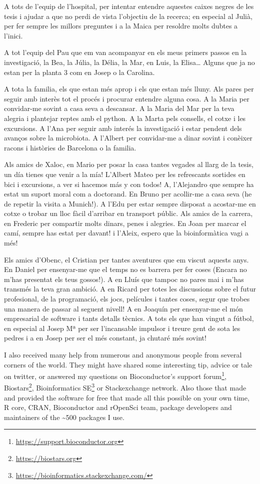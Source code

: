 \documentclass[
  12pt,
  a4paper,
  twoside,
  openright]{book}
\DeclareRobustCommand{\href}[2]{#2\footnote{\url{#1}}}
\begin{document}
A tots de l'equip de l'hospital, per intentar entendre aquestes caixes negres de les tesis i ajudar a que no perdi de vista l'objectiu de la recerca; en especial al Julià, per fer sempre les millors preguntes i a la Maica per resoldre molts dubtes a l'inici.

A tot l'equip del Pau que em van acompanyar en els meus primers passos en la investigació, la Bea, la Júlia, la Délia, la Mar, en Luis, la Elisa\ldots{}
Alguns que ja no estan per la planta 3 com en Josep o la Carolina.

A tota la familia, els que estan més aprop i els que estan més lluny.
Als pares per seguir amb interès tot el procés i procurar entendre alguna cosa.
A la Maria per convidar-me sovint a casa seva a descansar.
A la Maria del Mar per la teva alegria i plantejar reptes amb el python.
A la Marta pels consells, el cotxe i les excursions.
A l'Ana per seguir amb interés la investigació i estar pendent dels avanços sobre la microbiota.
A l'Albert per convidar-me a dinar sovint i conèixer racons i històries de Barcelona o la familia.

Als amics de Xaloc, en Mario per posar la casa tantes vegades al llarg de la tesis, un día tienes que venir a la mía!
L'Albert Mateo per les refrescants sortides en bici i excursions, a ver si hacemos más y con todos!
A, l'Alejandro que sempre ha estat un suport moral com a doctorand.
En Bruno per acollir-me a casa seva (he de repetir la visita a Munich!).
A l'Edu per estar sempre disposat a acostar-me en cotxe o trobar un lloc fàcil d'arribar en transport públic.
Als amics de la carrera, en Frederic per compartir molts dinars, penes i alegries.
En Joan per marcar el camí, sempre has estat per davant! i l'Aleix, espero que la bioinformàtica vagi a més!

Els amics d'Obenc, el Cristian per tantes aventures que em viscut aquests anys.
En Daniel per ensenyar-me que el temps no es barrera per fer coses (Encara no m'has presentat els teus gossos!).
A en Lluís que tampoc no pares mai i m'has transmés la teva gran ambició.
A en Ricard per totes les discussions sobre el futur profesional, de la programació, els jocs, películes i tantes coses, segur que trobes una manera de passar al seguent nivell!
A en Joaquín per ensenyar-me el món empresarial de software i tants detalls tècnics.
A tots els que han vingut a fútbol, en especial al Josep Mª per ser l'incansable impulsor i treure gent de sota les pedres i a en Josep per ser el més constant, ja chutaré més sovint!

I also received many help from numerous and anonymous people from several corners of the world.
They might have shared some interesting tip, advice or tale on twitter, or answered my questions on \href{https://support.bioconductor.org}{Bioconductor's support forum}, \href{https://biostars.org}{Biostars}, \href{https://bioinformatics.stackexchange.com/}{Bioinformatics SE} or Stackexchange network.
Also those that made and provided the software for free that made all this possible on your own time, R core, CRAN, Bioconductor and rOpenSci team, package developers and maintainers of the \textasciitilde500 packages I use.
\end{document}
